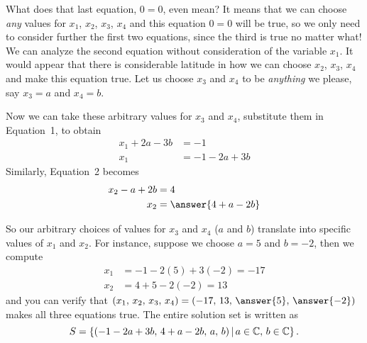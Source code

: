\documentclass{ximera}
\begin{document}
\begin{example}
  \begin{question}
    What does that last equation, $0=0$, even mean?  It means that we
    can choose \textit{any} values for $x_1$, $x_2$, $x_3$, $x_4$ and
    this equation $0=0$ will be true, so we only need to consider
    further the first two equations, since the third is true no matter
    what!  We can analyze the second equation without consideration of
    the variable $x_1$.  It would appear that there is considerable
    latitude in how we can choose $x_2$, $x_3$, $x_4$ and make this
    equation true.  Let us choose $x_3$ and $x_4$ to be
    \textit{anything} we please, say $x_3=a$ and $x_4=b$.

    Now we can take these arbitrary values for $x_3$ and $x_4$, substitute them in Equation~1, to obtain
    \begin{align*}
      x_1+2a - 3b&= -1\\
      x_1&=-1-2a+3b
    \end{align*}
    Similarly, Equation~2 becomes
    \begin{align*}
      x_2-a+2b&=4\\
      x_2&=\answer{4 +a -2 b}
    \end{align*}
  \end{question}
  
  \begin{question}
    So our arbitrary choices of values for $x_3$ and $x_4$ ($a$ and
    $b$) translate into specific values of $x_1$ and $x_2$.  For
    instance, suppose we choose $a=5$ and $b=-2$, then we compute
    \begin{align*}
      x_1&=-1-2(5)+3(-2)=-17\\
      x_2&=4+5-2(-2)=13
    \end{align*}
    and you can verify that $(x_1,\,x_2,\,x_3,\,x_4)=(-17,\,13,\,\answer{5},\,\answer{-2})$ makes all three equations true.  The entire solution set is written as
    \[
      S=\left\lbrace(-1-2a+3b,\,4 +a-2b,\,a,\,b)\,\middle|\, a\in\mathbb{C},\,b\in\mathbb{C}\right\rbrace.
    \]
  \end{question}
\end{example}
\end{document}
